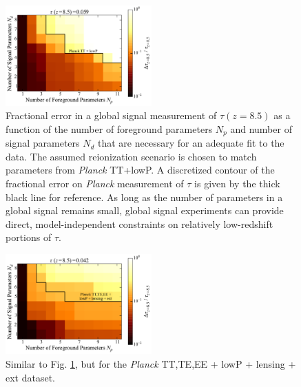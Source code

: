 \documentclass[twocolumn,aps,prd,nofootinbib,showpacs]{revtex4-1}
\begin{document}
\begin{figure}[!]
\centering
\includegraphics[width=0.5\textwidth]{figures/PlanckTTlowP_globalSigErrors.pdf}
\caption{Fractional error in a global signal measurement of $\tau(z=8.5)$ as a function of the number of foreground parameters $N_p$ and number of signal parameters $N_d$ that are necessary for an adequate fit to the data. The assumed reionization scenario is chosen to match parameters from \emph{Planck} TT+lowP. A discretized contour of the fractional error on \emph{Planck} measurement of $\tau$ is given by the thick black line for reference. As long as the number of parameters in a global signal remains small, global signal experiments can provide direct, model-independent constraints on relatively low-redshift portions of $\tau$.}
\label{fig:PlanckTTlowP_globalSigErrors}
\end{figure}

\begin{figure}[!]
\centering
\includegraphics[width=0.5\textwidth]{figures/PlanckTTTEEElowPlensingext_globalSigErrors.pdf}
\caption{Similar to Fig. \ref{fig:PlanckTTlowP_globalSigErrors}, but for the \emph{Planck} TT,TE,EE + lowP + lensing + ext  dataset.}
\label{fig:PlanckTTTEEElowPlensingext_globalSigErrors}
\end{figure}
\end{document}
